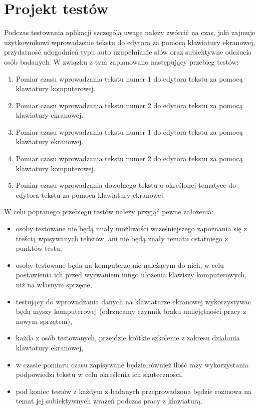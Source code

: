 \documentclass[twoside,a4paper]{book}
\begin{document}
\section{Projekt testów}
Podczas testowania aplikacji szczególą uwagę należy zwórcić na czas, jaki zajmuje użytkownikowi wprowadzenie tekstu do edytora za pomocą klawiatury ekranowej, przydatność udogodnień typu auto uzupełnianie słów oraz subiektywne odczucia osób badanych. W związku z tym zaplanowano następujący przebieg testów:
\begin{enumerate}
\item Pomiar czasu wprowadzania tekstu numer 1 do edytora tekstu za pomocą klawiatury komputerowej. 
\item Pomiar czasu wprowadzania tekstu numer 2 do edytora tekstu za pomocą klawiatury ekranowej. 
\item Pomiar czasu wprowadzania tekstu numer 1 do edytora tekstu za pomocą klawiatury ekranowej. 
\item Pomiar czasu wprowadzania tekstu numer 2 do edytora tekstu za pomocą klawiatury komputerowej.
\item Pomiar czasu wprowadzania dowolnego tekstu o określonej tematyce do edytora tekstu za pomocą klawiatury ekranowej.  
\end{enumerate}
W celu popranego przebiegu testów należy przyjąć pewne założenia:
\begin{itemize}
\item osoby testowane nie będą miały możliwości wcześniejszego zapoznania się z treścią wpisywanych tekstów, ani nie będą znały tematu ostatniego z punktów testu,    
\item osoby testowane będa na komputerze nie należącym do nich, w celu postawienia ich przed wyzwaniem inngo ułożenia klawiszy komputerowych, niż na własnym sprzęcie, 
\item testujący do wprowadzania danych na klawiaturze ekranowej wykorzystywac będą myszy komputerowej (odrzucamy czynnik braku umiejętności pracy z nowym sprzętem),
\item każda z osób testowanych, przejdzie krótkie szkolenie z zakresu działania klawiatury ekranowej,
\item w czasie pomiaru czasu zapisywane będzie również ilość razy wykorzystania podpowiedzi tekstu w celu określenia ich skuteczności,
\item pod koniec testów z każdym z badanych przeprowadzona będzie  rozmowa na temat jej subiektywnych wrażeń podczas pracy z klawiaturą.
\end{itemize}
\end{document}
